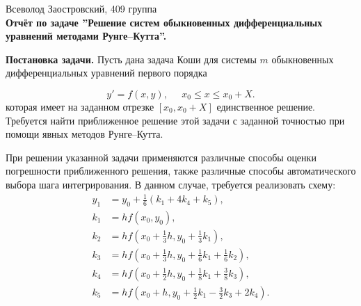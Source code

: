 \documentclass[14pt,a4paper]{extarticle}
\newcommand{\1}{\mathbbm{1}}
\begin{document}
\begin{center}

    {Всеволод Заостровский, 409 группа}\\
    {\bfseries Отчёт по задаче ''Решение систем обыкновенных дифференциальных уравнений методами Рунге--Кутта''.\\}
    \vspace{1cm}

\end{center}

\textbf{Постановка задачи.} Пусть дана задача Коши для системы $m$ обыкновенных 
дифференциальных уравнений первого порядка

\begin{equation}
    y' = f(x, y), \;\;\;\;\; x_0 \leq x \leq x_0 + X .
\end{equation}
которая имеет на заданном отрезке $[x_0, x_0+X]$ единственное решение. Требуется
найти приближенное решение этой задачи с заданной точностью при помощи
явных методов Рунге–Кутта.
\par
При решении указанной задачи применяются различные способы оценки
погрешности приближенного решения, также различные способы автоматического 
выбора шага интегрирования. В данном случае, требуется реализовать схему:
\begin{align*}
    y_1 &= y_0 + \frac{1}{6} (k_1 + 4 k_4 + k_5), \\
    k_1 &= h f(x_0, y_0), \\
    k_2 &= h f\left( x_0 + \frac{1}{3}h, y_0 + \frac{1}{3} k_1\right), \\
    k_3 &= h f\left( x_0 + \frac{1}{3}h, y_0 + \frac{1}{6} k_1 + \frac{1}{6} k_2\right), \\
    k_4 &= h f\left( x_0 + \frac{1}{2}h, y_0 + \frac{1}{8} k_1 + \frac{3}{8} k_3\right), \\
    k_5 &= h f\left( x_0 +            h, y_0 + \frac{1}{2} k_1 - \frac{3}{2} k_3 + 2 k_4\right). \\
\end{align*}
\end{document}

